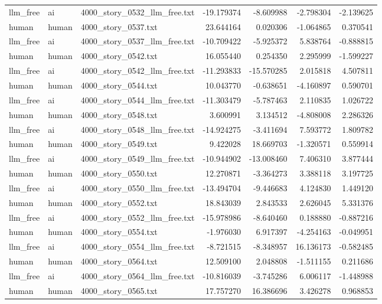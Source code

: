 \begin{longtable}{lllrrrr}
llm\_free & ai & 4000\_story\_0532\_llm\_free.txt & -19.179374 & -8.609988 & -2.798304 & -2.139625 \\
human & human & 4000\_story\_0537.txt & 23.644164 & 0.020306 & -1.064865 & 0.370541 \\
llm\_free & ai & 4000\_story\_0537\_llm\_free.txt & -10.709422 & -5.925372 & 5.838764 & -0.888815 \\
human & human & 4000\_story\_0542.txt & 16.055440 & 0.254350 & 2.295999 & -1.599227 \\
llm\_free & ai & 4000\_story\_0542\_llm\_free.txt & -11.293833 & -15.570285 & 2.015818 & 4.507811 \\
human & human & 4000\_story\_0544.txt & 10.043770 & -0.638651 & -4.160897 & 0.590701 \\
llm\_free & ai & 4000\_story\_0544\_llm\_free.txt & -11.303479 & -5.787463 & 2.110835 & 1.026722 \\
human & human & 4000\_story\_0548.txt & 3.600991 & 3.134512 & -4.808008 & 2.286326 \\
llm\_free & ai & 4000\_story\_0548\_llm\_free.txt & -14.924275 & -3.411694 & 7.593772 & 1.809782 \\
human & human & 4000\_story\_0549.txt & 9.422028 & 18.669703 & -1.320571 & 0.559914 \\
llm\_free & ai & 4000\_story\_0549\_llm\_free.txt & -10.944902 & -13.008460 & 7.406310 & 3.877444 \\
human & human & 4000\_story\_0550.txt & 12.270871 & -3.364273 & 3.388118 & 3.197725 \\
llm\_free & ai & 4000\_story\_0550\_llm\_free.txt & -13.494704 & -9.446683 & 4.124830 & 1.449120 \\
human & human & 4000\_story\_0552.txt & 18.843039 & 2.843533 & 2.626045 & 5.331376 \\
llm\_free & ai & 4000\_story\_0552\_llm\_free.txt & -15.978986 & -8.640460 & 0.188880 & -0.887216 \\
human & human & 4000\_story\_0554.txt & -1.976030 & 6.917397 & -4.254163 & -0.049951 \\
llm\_free & ai & 4000\_story\_0554\_llm\_free.txt & -8.721515 & -8.348957 & 16.136173 & -0.582485 \\
human & human & 4000\_story\_0564.txt & 12.509100 & 2.048808 & -1.511155 & 0.211686 \\
llm\_free & ai & 4000\_story\_0564\_llm\_free.txt & -10.816039 & -3.745286 & 6.006117 & -1.448988 \\
human & human & 4000\_story\_0565.txt & 17.757270 & 16.386696 & 3.426278 & 0.968853 \\

\end{longtable}
